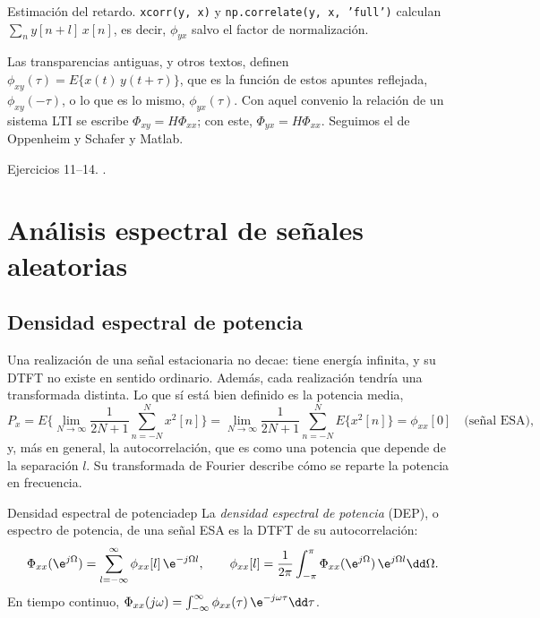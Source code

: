 \documentclass[11pt,a4paper]{scrartcl}
\begin{document}
\begin{encodigo}
  Estimación del retardo. \texttt{xcorr(y, x)} y \texttt{np.correlate(y, x, 'full')} calculan $\sum_ny[n+l]\,x[n]$, es decir, $\phi_{yx}$ salvo el factor de normalización.
\end{encodigo}

\begin{nota}
  Las transparencias antiguas, y otros textos, definen $\phi_{xy}(\tau)=E\{x(t)\,y(t+\tau)\}$, que es la función de estos apuntes reflejada, $\phi_{xy}(-\tau)$, o lo que es lo mismo, $\phi_{yx}(\tau)$. Con aquel convenio la relación de un sistema LTI se escribe $\Phi_{xy}=H\Phi_{xx}$; con este, $\Phi_{yx}=H\Phi_{xx}$. Seguimos el de Oppenheim y Schafer y Matlab.
\end{nota}

\begin{flushright}\small\color{pdsgris}Ejercicios 11–14. .\end{flushright}

\section{Análisis espectral de señales aleatorias}\label{sec:espectral}

\subsection{Densidad espectral de potencia}

Una realización de una señal estacionaria no decae: tiene energía infinita, y su DTFT no existe en sentido ordinario. Además, cada realización tendría una transformada distinta. Lo que sí está bien definido es la potencia media,
\[
  P_x=E\Big\{\lim_{N\to\infty}\frac1{2N+1}\sum_{n=-N}^Nx^2[n]\Big\}=\lim_{N\to\infty}\frac1{2N+1}\sum_{n=-N}^NE\{x^2[n]\}=\phi_{xx}[0]\quad\text{(señal ESA)},
\]
y, más en general, la autocorrelación, que es como una potencia que depende de la separación $l$. Su transformada de Fourier describe cómo se reparte la potencia en frecuencia.

\begin{definicion}{Densidad espectral de potencia}{dep}
  La \emph{densidad espectral de potencia} (DEP), o espectro de potencia, de una señal ESA es la DTFT de su autocorrelación:
  \[
    \Phi_{xx}(\e^{j\Omega})=\sum_{l=-\infty}^{\infty}\phi_{xx}[l]\,\e^{-j\Omega l},\qquad
    \phi_{xx}[l]=\frac1{2\pi}\int_{-\pi}^{\pi}\Phi_{xx}(\e^{j\Omega})\,\e^{j\Omega l}\dd\Omega .
  \]
  En tiempo continuo, $\Phi_{xx}(j\omega)=\int_{-\infty}^{\infty}\phi_{xx}(\tau)\,\e^{-j\omega\tau}\dd\tau$.
\end{definicion}
\end{document}
